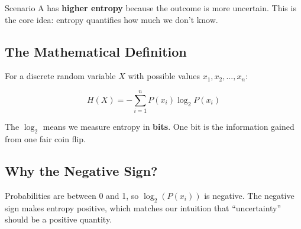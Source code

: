 \documentclass[
  11pt,
  letterpaper,
  oneside,
  openany]{book}
\begin{document}
Scenario A has \textbf{higher entropy} because the outcome is more
uncertain. This is the core idea: entropy quantifies how much we don't
know.

\subsection{The Mathematical
Definition}\label{the-mathematical-definition}

For a discrete random variable \(X\) with possible values
\(x_1, x_2, ..., x_n\):

\[H(X) = -\sum_{i=1}^{n} P(x_i) \log_2 P(x_i)\]

The \(\log_2\) means we measure entropy in \textbf{bits}. One bit is the
information gained from one fair coin flip.

\subsection{Why the Negative Sign?}\label{why-the-negative-sign}

Probabilities are between 0 and 1, so \(\log_2(P(x_i))\) is negative.
The negative sign makes entropy positive, which matches our intuition
that ``uncertainty'' should be a positive quantity.
\end{document}
